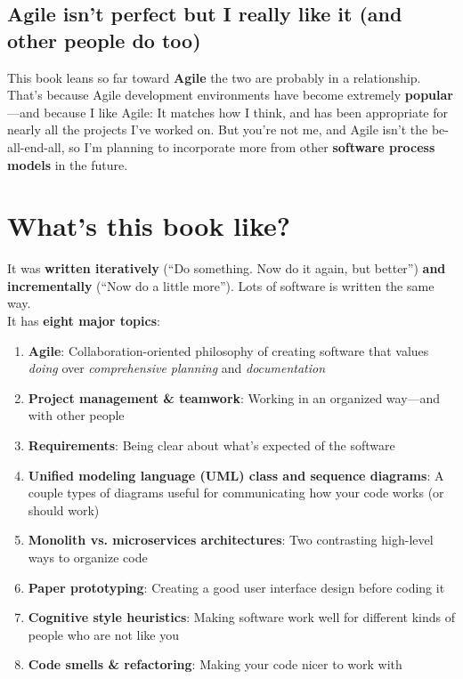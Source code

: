 \subsection{Agile isn't perfect but I really like it (and other people do too)}
This book leans so far toward \textbf{Agile} the two are probably in a relationship. That's because Agile development environments have become extremely \textbf{popular}---and because I like Agile: It matches how I think, and has been appropriate for nearly all the projects I've worked on. But you're not me, and Agile isn't the be-all-end-all, so I'm planning to incorporate more from other \textbf{software process models} in the future.

\section{What's this book like?}

It was \textbf{written iteratively} (``Do something. Now do it again, but better'') \textbf{and incrementally} (``Now do a little more''). Lots of software is written the same way. \\

\noindent It has \textbf{eight major topics}:

\begin{enumerate}
    \item \textbf{Agile}: Collaboration-oriented philosophy of creating software that values \textit{doing} over \textit{comprehensive planning} and \textit{documentation}
    \item \textbf{Project management \& teamwork}: Working in an organized way---and with other people
    \item \textbf{Requirements}: Being clear about what's expected of the software
    \item \textbf{Unified modeling language (UML) class and sequence diagrams}: A couple types of diagrams useful for communicating how your code works (or should work)
    \item \textbf{Monolith vs. microservices architectures}: Two contrasting high-level ways to organize code
    \item \textbf{Paper prototyping}: Creating a good user interface design before coding it
    \item \textbf{Cognitive style heuristics}: Making software work well for different kinds of people who are not like you
    \item \textbf{Code smells \& refactoring}: Making your code nicer to work with
\end{enumerate}


